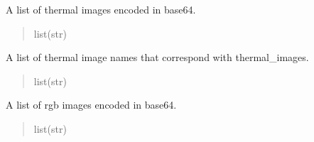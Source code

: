 \documentclass[letterpaper,10pt,english]{sphinxmanual}
\begin{document}
\begin{fulllineitems}
\begin{fulllineitems}
\begin{quote}
\begin{description}
\end{description}\end{quote}

\end{fulllineitems}


\begin{fulllineitems}
\label{\detokenize{modules/src.pig_sorting_api.main:src.pig_sorting_api.main.SwineDataSave.thermal_images}}
\pysigstartsignatures
\pysigline
{}
\pysigstopsignatures
\sphinxAtStartPar
A list of thermal images encoded in base64.
\begin{quote}\begin{description}
\sphinxAtStartPar
list(str)

\end{description}\end{quote}

\end{fulllineitems}


\begin{fulllineitems}
\label{\detokenize{modules/src.pig_sorting_api.main:src.pig_sorting_api.main.SwineDataSave.thermal_image_names}}
\pysigstartsignatures
\pysigline
{}
\pysigstopsignatures
\sphinxAtStartPar
A list of thermal image names that correspond with thermal\_images.
\begin{quote}\begin{description}
\sphinxAtStartPar
list(str)

\end{description}\end{quote}

\end{fulllineitems}


\begin{fulllineitems}
\label{\detokenize{modules/src.pig_sorting_api.main:src.pig_sorting_api.main.SwineDataSave.rgb_images}}
\pysigstartsignatures
\pysigline
{}
\pysigstopsignatures
\sphinxAtStartPar
A list of rgb images encoded in base64.
\begin{quote}\begin{description}
\sphinxAtStartPar
list(str)


\end{description}
\end{quote}
\end{fulllineitems}
\end{fulllineitems}
\end{document}
